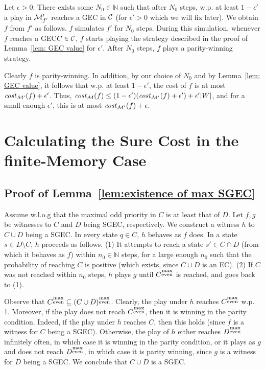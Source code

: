 \documentclass[runningheads,a4paper]{llncs}
\newcommand{\Nat}{\mathbb{N}}
\newcommand{\C}{{\cal C}}
\newcommand{\M}{{\cal M}}
\newcommand{\cost}{{\it cost}}
\newcommand{\gec}{{GEC}\xspace}
\newcommand{\sgec}{{SGEC}\xspace}
\newcommand{\me}{{\substack{\rm max\\ \rm even}}}
\begin{document}
Let $\epsilon>0$. There exists some $N_0\in \Nat$ such that after $N_0$ steps, w.p. at least $1-\epsilon'$ a play in $\M'_{f'}$ reaches a \gec in $\C$ (for $\epsilon'>0$ which we will fix later). We obtain $f$ from $f'$ as follows. $f$ simulates $f'$ for $N_0$ steps. During this simulation, whenever $f$ reaches a \gec $C\in \C$, $f$ starts playing the strategy described in the proof of Lemma~\ref{lem: GEC value} for $\epsilon'$. After $N_0$ steps, $f$ plays a parity-winning strategy. 

Clearly $f$ is parity-winning. In addition, by our choice of $N_0$ and by Lemma~\ref{lem: GEC value}, it follows that w.p. at least $1-\epsilon'$, the cost of $f$ is at most $\cost_{\M'}(f)+\epsilon'$. Thus, $\cost_{\M}(f)\le (1-\epsilon')(\cost_{\M'}(f)+\epsilon')+\epsilon'|W|$, and for a small enough $\epsilon'$, this is at most $\cost_{\M'}(f)+\epsilon$.


\section{Calculating the Sure Cost in the finite-Memory Case}
\label{apx:finite memory}

\subsection{Proof of Lemma~\ref{lem:existence of max SGEC}}
\label{apx:existence of max SGEC}
Assume w.l.o.g that the maximal odd priority in $C$ is at least that of $D$. Let $f,g$ be witnesses to $C$ and $D$ being \sgec, respectively. We construct a witness $h$ to $C\cup D$ being a \sgec. In every state $q\in C$, $h$ behaves as $f$ does. In a state $s\in D\setminus C$, $h$ proceeds as follows. (1) It attempts to reach a state $s'\in C\cap D$ (from which it behaves as $f$) within $n_0\in \Nat$ steps, for a large enough $n_0$ such that the probability of reaching $C$ is positive (which exists, since $C\cup D$ is an EC). (2) If $C$ was not reached within $n_0$ steps, $h$ plays $g$ until $C^\me$ is reached, and goes back to (1). 

Observe that $C^\me\subseteq (C\cup D)^\me$. Clearly, the play under $h$ reaches $C^\me$ w.p. 1. Moreover, if the play does not reach $C^\me$, then it is winning in the parity condition. Indeed, if the play under $h$ reaches $C$, then this holds (since $f$ is a witness for $C$ being a \sgec). Otherwise, the play of $h$ either reaches $D^\me$ infinitely often, in which case it is winning in the parity condition, or it plays as $g$ and does not reach $D^\me$, in which case it is parity winning, since $g$ is a witness for $D$ being a \sgec. 
We conclude that $C\cup D$ is a \sgec.
\end{document}
